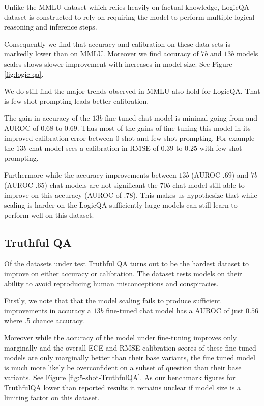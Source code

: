 \documentclass[11pt]{article}
\begin{document}
Unlike the MMLU dataset which relies heavily on factual 
knowledge, LogicQA dataset is constructed to rely 
on requiring the model to perform multiple 
logical reasoning and inference steps. 

Consequently we find that accuracy and 
calibration on  these data sets is markedly lower 
than on MMLU.  Moreover we find accuracy of 
$7b$ and $13b$ models scales shows slower 
improvement with increases  in model size. 
See Figure \ref{fig:logic-qa}.

We do still find the major trends observed in 
MMLU also hold for LogicQA. That is few-shot 
prompting leads better calibration. 

The gain in accuracy of the $13b$ fine-tuned 
chat model is minimal going from and AUROC of 
$0.68$ to $0.69$. Thus most of the gains of 
fine-tuning  this model in its improved 
calibration error between $0$-shot and 
few-shot prompting. For example the $13b$ 
chat model sees a calibration in RMSE 
of $0.39$ to $0.25$ with few-shot 
prompting. 

Furthermore while the accuracy improvements 
between $13b$ (AUROC $.69$) and $7b$(AUROC $.65$) 
chat models are not significant the $70b$ chat 
model still able to improve on this accuracy 
(AUROC of $.78$). This makes us  hypothesize that while scaling is harder on the LogicQA sufficiently large models can still learn to perform well on this dataset.

\subsection{Truthful QA}

Of the datasets under test Truthful QA turns out to be 
the hardest dataset to improve on either accuracy 
or calibration. The dataset tests models  on 
their ability to avoid reproducing human 
misconceptions and conspiracies. 

Firstly, we note that that the model scaling fails 
to produce sufficient improvements in accuracy a $13b$  
fine-tuned chat model has a AUROC of just $0.56$ where 
$.5$ chance accuracy.  

Moreover while the accuracy of the model under 
fine-tuning improves only marginally and the overall 
ECE and  RMSE calibration scores of these fine-tuned models are only marginally better than their base variants, the fine tuned model is much 
more likely be overconfident on a subset of question than their base variants.  See Figure \ref{fig:5-shot-TruthfulQA}. As our benchmark figures for 
TruthfulQA lower than reported results it remains unclear if model size is a limiting factor on this dataset.
\end{document}
